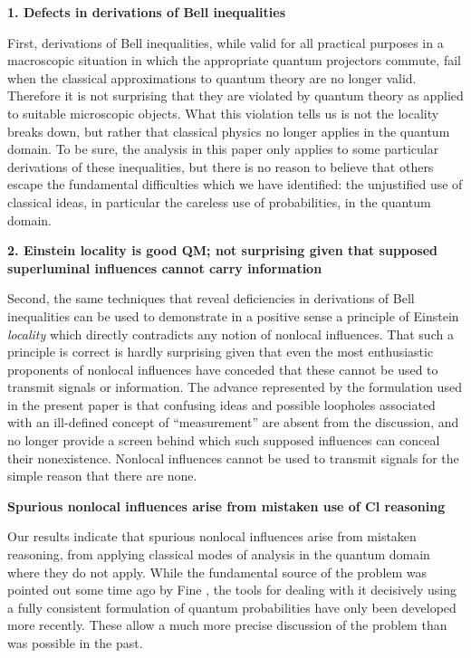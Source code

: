 \documentclass[10pt]{article} %
\def\outl#1{\par{\medskip\noindent\hspace*{.5cm}\bf
      \mathversion{bold}#1\mathversion{normal}\smallskip} }
\def\np{} \def\xa{} \def\xb{} \def\xn{} \def\xp{}
\def\outl#1{} \def\np{} \def\xa{} \def\xb{} \def\xn{} \def\xp{}
\def\outl#1{\par{\medskip\noindent\hspace*{.5cm}\bf
      \mathversion{bold}#1\mathversion{normal}\smallskip} }
\def\np{\newpage }\def\xn{\nopagebreak }\def\xp{\pagebreak }
\begin{document}
\xb
\outl{1. Defects in derivations of Bell inequalities}
\xa


First, derivations of Bell inequalities, while valid for all practical purposes
in a macroscopic situation in which the appropriate quantum projectors
commute, fail when the classical approximations to quantum theory are no
longer valid.  Therefore it is not surprising that they are violated by
quantum theory as applied to suitable microscopic objects.  What this
violation tells us is not the locality breaks down, but rather that classical
physics no longer applies in the quantum domain.  To be sure, the analysis in
this paper only applies to some particular derivations of these inequalities,
but there is no reason to believe that others escape the fundamental
difficulties which we have identified: the unjustified use of classical ideas,
in particular the careless use of probabilities, in the quantum domain.

\xb
\outl{2. Einstein locality is good QM; not surprising given that supposed
  superluminal influences cannot carry information}
\xa


Second, the same techniques that reveal deficiencies in derivations of Bell
inequalities can be used to demonstrate in a positive sense a principle of
Einstein \emph{locality} which directly contradicts any notion of nonlocal
influences.  That such a principle is correct is hardly surprising given that
even the most enthusiastic proponents of nonlocal influences have conceded
that these cannot be used to transmit signals or information.  The advance
represented by the formulation used in the present paper is that confusing
ideas and possible loopholes associated with an ill-defined concept of
``measurement''  are absent from the discussion, and no longer provide a
screen behind which such supposed influences can conceal their nonexistence.
Nonlocal influences cannot be used to transmit signals for the simple reason
that there are none.  

\xb
\outl{Spurious nonlocal influences arise from mistaken use of Cl reasoning}
\xa


Our results indicate that spurious nonlocal influences arise from mistaken
reasoning, from applying classical modes of analysis in the quantum domain
where they do not apply.  While the fundamental source of the problem was
pointed out some time ago by Fine \cite{Fne82}, the tools for dealing with it
decisively using a fully consistent formulation of quantum probabilities have
only been developed more recently. These allow a much more precise discussion
of the problem than was possible in the past. 
\end{document}
